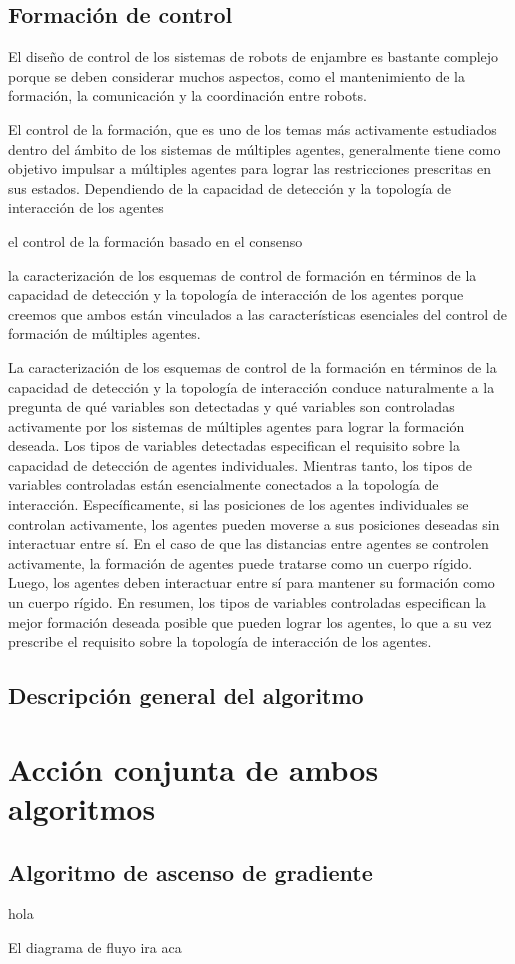 \subsection{Formación de control}

El diseño de control de los sistemas de robots de enjambre es bastante complejo porque se deben considerar muchos aspectos, como el mantenimiento de la formación, la comunicación y la coordinación entre robots.

El control de la formación, que es uno de los temas más activamente estudiados dentro del ámbito de los sistemas de múltiples agentes, generalmente tiene como objetivo impulsar a múltiples agentes para lograr las restricciones prescritas en sus estados. Dependiendo de la capacidad de detección y la topología de interacción de los agentes

el control de la formación basado en el consenso

la caracterización de los esquemas de control de formación en términos de la capacidad de detección y la topología de interacción de los agentes porque creemos que ambos están vinculados a las características esenciales del control de formación de múltiples agentes.

La caracterización de los esquemas de control de la formación en términos de la capacidad de detección y la topología de interacción conduce naturalmente a la pregunta de qué variables son detectadas y qué variables son controladas activamente por los sistemas de múltiples agentes para lograr la formación deseada. Los tipos de variables detectadas especifican el requisito sobre la capacidad de detección de agentes individuales. Mientras tanto, los tipos de variables controladas están esencialmente conectados a la topología de interacción. Específicamente, si las posiciones de los agentes individuales se controlan activamente, los agentes pueden moverse a sus posiciones deseadas sin interactuar entre sí. En el caso de que las distancias entre agentes se controlen activamente, la formación de agentes puede tratarse como un cuerpo rígido. Luego, los agentes deben interactuar entre sí para mantener su formación como un cuerpo rígido. En resumen, los tipos de variables controladas especifican la mejor formación deseada posible que pueden lograr los agentes, lo que a su vez prescribe el requisito sobre la topología de interacción de los agentes.

\subsection{Descripción general del algoritmo}



\section{Acción conjunta de ambos algoritmos}


\subsection{Algoritmo de ascenso de gradiente}
hola

El diagrama de fluyo ira aca

